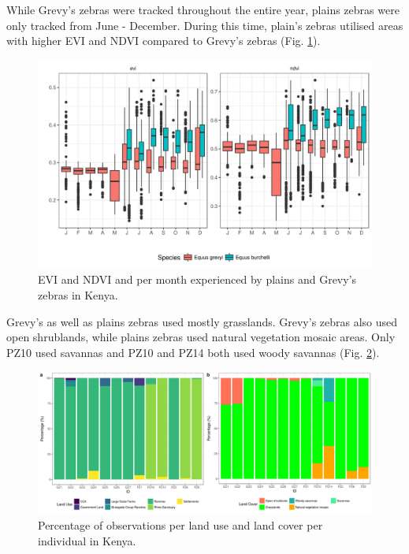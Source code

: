 \documentclass[12pt,a4paper, twoside, english]{article}
\begin{document}

While Grevy's zebras were tracked throughout the entire year, plains zebras were only tracked from June - December. During this time, plain's zebras utilised areas with higher EVI and NDVI compared to Grevy's zebras (Fig. \ref{fig:vi_month_sp_ken}).

\begin{figure}[H]
  \centering
  \includegraphics[width=\textwidth]{figures/vi_month_sp_KEN.png}
  \caption[Monthly NDVI and EVI of Laikipia zebra movements]{EVI and NDVI and per month experienced by plains and Grevy's zebras in Kenya.}
  \label{fig:vi_month_sp_ken}
\end{figure}

Grevy's as well as plains zebras used mostly grasslands. Grevy's zebras also used open shrublands, while plains zebras used natural vegetation mosaic areas. Only PZ10 used savannas and PZ10 and PZ14 both used woody savannas (Fig. \ref{fig:lulc_ken}).

\begin{figure}[H]
  \centering
  \includegraphics[width=\textwidth]{figures/Zebra_KEN_LULC.png}
  \caption[LULC utilised by Laikipia zebras]{Percentage of observations per land use and land cover per individual in Kenya.}
  \label{fig:lulc_ken}
\end{figure}
\newpage
\end{document}
